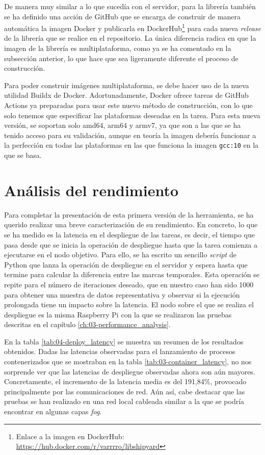 De manera muy similar a lo que sucedía con el servidor, para la librería también
se ha definido una acción de GitHub que se encarga de construir de manera
automática la imagen Docker y publicarla en DockerHub\footnote{Enlace a la
    imagen en DockerHub: \url{https://hub.docker.com/r/varrrro/libshipyard}} para
cada nueva \textit{release} de la librería que se realice en el repositorio. La
única diferencia radica en que la imagen de la librería es multiplataforma, como
ya se ha comentado en la subsección anterior, lo que hace que sea ligeramente
diferente el proceso de construcción.

Para poder construir imágenes multiplataforma, se debe hacer uso de la nueva
utilidad Buildx de Docker. Adortunadamente, Docker ofrece tareas de GitHub
Actions ya preparadas para usar este nuevo método de construcción, con lo que
solo tenemos que especificar las plataformas deseadas en la tarea. Para esta
nueva versión, se soportan solo amd64, arm64 y armv7, ya que son a las que se ha
tenido acceso para su validación, aunque en teoría la imagen debería funcionar a
la perfección en todas las plataformas en las que funciona la imagen
\texttt{gcc:10} en la que se basa.

\section{Análisis del rendimiento}

Para completar la presentación de esta primera versión de la herramienta, se ha
querido realizar una breve caracterización de su rendimiento. En concreto, lo
que se ha medido es la latencia en el despliegue de las tareas, es decir, el
tiempo que pasa desde que se inicia la operación de despliegue hasta que la
tarea comienza a ejecutarse en el nodo objetivo. Para ello, se ha escrito un
sencillo \textit{script} de Python que lanza la operación de despliegue en el
servidor y espera hasta que termine para calcular la diferencia entre las marcas
temporales. Esta operación se repite para el número de iteraciones deseado, que
en nuestro caso han sido 1000 para obtener una muestra de datos representativa y
observar si la ejecución prolongada tiene un impacto sobre la latencia. El
nodo sobre el que se realiza el despliegue es la misma Raspberry Pi con la que
se realizaron las pruebas descritas en el capítulo
\ref{ch:03-performance_analysis}.

En la tabla \ref{tab:04-deploy_latency} se muestra un resumen de los resultados
obtenidos. Dadas las latencias observadas para el lanzamiento de procesos
contenerizados que se mostraban en la tabla \ref{tab:03-container_latency}, no
nos sorprende ver que las latencias de despliegue observadas ahora son aún
mayores. Concretamente, el incremento de la latencia media es del 191,84\%,
provocado principalmente por las comunicaciones de red. Aún así, cabe destacar
que las pruebas se han realizado en una red local cableada similar a la que se
podría encontrar en algunas capas \textit{fog}.

